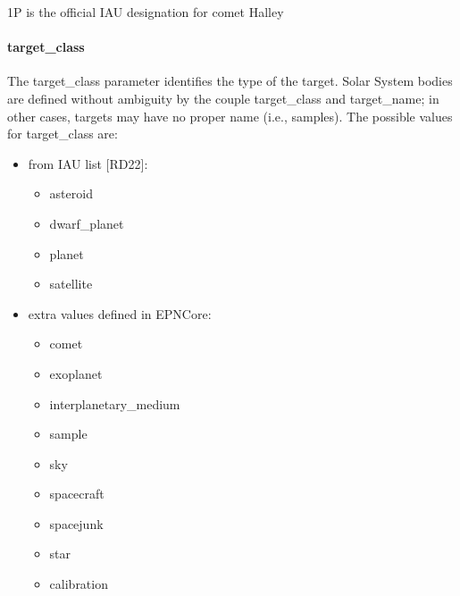\documentclass[11pt,a4paper]{ivoa}
\begin{document}
1P is the official IAU designation for comet Halley

\paragraph{target\_class}

The target\_class parameter identifies the type of the target. Solar System bodies are defined without ambiguity by the couple target\_class and target\_name; in other cases, targets may have no proper name (i.e., samples).  The possible values for target\_class are:

\begin{itemize}

\item from IAU list [RD22]:\begin{itemize}

\item asteroid

\item dwarf\_planet

\item planet

\item satellite

\end{itemize}

\item extra values defined in EPNCore:\begin{itemize}

\item comet

\item exoplanet

\item interplanetary\_medium

\item sample

\item sky

\item spacecraft

\item spacejunk

\item star

\item calibration

\end{itemize}

\end{itemize}
\end{document}
